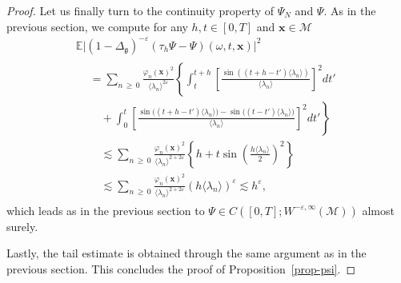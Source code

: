 \documentclass[10pt,a4paper]{article}
\renewcommand{\th}{\tau_h}
\newcommand{\E}{\mathbb{E}}
\newcommand{\x}{\mathbf{x}}
\newcommand{\M}{\mathcal{M}}
\newcommand{\g}{\mathfrak{g}}
\newcommand{\Dlg}{\Delta_{\g}}
\newcommand{\eps}{\varepsilon}
\renewcommand{\o}{\omega}
\newcommand{\les}{\lesssim}
\newcommand{\jb}[1] {\langle #1 \rangle}
\begin{document}
\begin{proof}
Let us finally turn to the continuity property of $\Psi_N$ and $\Psi$. As in the previous section, we compute for any $h,t\in [0,T]$ and $\x\in\M$
\begin{multline*}
\E\big|(1-\Dlg)^{-\eps}(\th \Psi-\Psi)(\o,t,\x)\big|^2 \\
\begin{aligned}
&= \sum_{n\,\geq\,0}\frac{\varphi_n(\x)^2}{\jb{\lambda_n}^{2\eps}}\left\{\int_t^{t+h}\left[\frac{\sin\left((t+h-t')\jb{\lambda_n}\right)}{\jb{\lambda_n}}\right]^2dt'\right. \\
&\quad+\left. \int_0^{t}\left[\frac{\sin\big((t+h-t')\jb{\lambda_n}\big)-\sin\big((t-t')\jb{\lambda_n}\big)}{\jb{\lambda_n}}\right]^2dt'\right\}\\
&\quad\les \sum_{n\,\geq\,0}\frac{\varphi_n(\x)^2}{\jb{\lambda_n}^{2+2\eps}}
\left\{h+t\sin\left(\frac{h\jb{\lambda_n}}{2}\right)^2\right\}\\
&\quad\les \sum_{n\,\geq\,0}\frac{\varphi_n(\x)^2}{\jb{\lambda_n}^{2+2\eps}}(h\jb{\lambda_n})^{\eps} \les h^{\eps},
\end{aligned}
\end{multline*}
which leads as in the previous section to $\Psi\in C([0,T];W^{-\eps,\infty}(\M))$ almost surely.

Lastly, the tail estimate is obtained through the same argument as in the previous section. This concludes the proof of Proposition~\ref{prop-psi}.
\end{proof}
\end{document}
